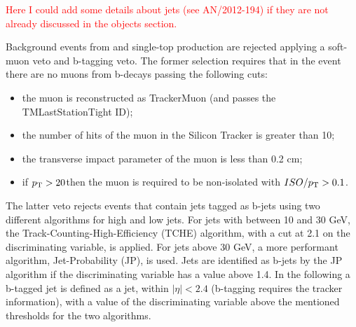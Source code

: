 \textcolor{red}{Here I could add some details about jets (see AN/2012-194) if they are not already discussed in the objects section.}

Background events from \ttbar and single-top production are rejected applying a soft-muon veto and b-tagging veto. The former selection requires that in the event there are no muons from b-decays passing the following cuts: 
\begin{itemize}
\item the muon is reconstructed as TrackerMuon (and passes the TMLastStationTight ID);
\item the number of hits of the muon in the Silicon Tracker is greater than 10;
\item the transverse impact parameter of the muon is less than 0.2 cm;
\item if $p_\mathrm{T} > 20$\GeV then the muon is required to be non-isolated with $ISO/p_\mathrm{T} > 0.1$.
\end{itemize}

The latter veto rejects events that contain jets tagged as b-jets using two different algorithms for high and low \pt jets. For jets with \pt between 10 and 30 GeV, the Track-Counting-High-Efficiency (TCHE) algorithm, with a cut at 2.1 on the discriminating variable, is applied.
For jets above 30 GeV, a more performant algorithm, Jet-Probability (JP), is used. Jets are identified as b-jets by the JP algorithm if the discriminating variable has a value above 1.4.
In the following a b-tagged jet is defined as a jet, within $|\eta|<2.4$ (b-tagging requires the tracker information), with a value of the discriminating variable above the mentioned thresholds for the two algorithms.  


